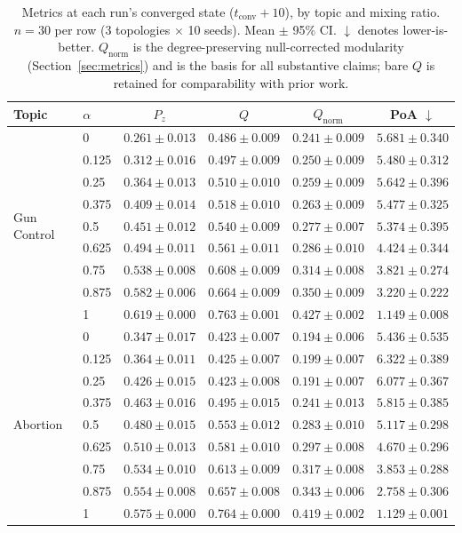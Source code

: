 \begin{table}[t]
\centering
\caption{Metrics at each run's converged state ($t_{\mathrm{conv}} + 10$), by topic and
mixing ratio. $n = 30$ per row (3 topologies $\times$ 10 seeds). Mean $\pm$ 95\% CI.
$\downarrow$ denotes lower-is-better. $Q_{\mathrm{norm}}$ is the degree-preserving
null-corrected modularity (Section~\ref{sec:metrics}) and is the basis for all
substantive claims; bare $Q$ is retained for comparability with prior work.}
\label{tab:main}
\begin{tabular}{llcccc}
\toprule
Topic & $\alpha$ & $P_z$ & $Q$ & $Q_{\mathrm{norm}}$ & PoA $\downarrow$ \\
\midrule
\multirow{9}{*}{Gun Control}
 & 0     & $0.261 \pm 0.013$ & $0.486 \pm 0.009$ & $0.241 \pm 0.009$ & $5.681 \pm 0.340$ \\
 & 0.125 & $0.312 \pm 0.016$ & $0.497 \pm 0.009$ & $0.250 \pm 0.009$ & $5.480 \pm 0.312$ \\
 & 0.25  & $0.364 \pm 0.013$ & $0.510 \pm 0.010$ & $0.259 \pm 0.009$ & $5.642 \pm 0.396$ \\
 & 0.375 & $0.409 \pm 0.014$ & $0.518 \pm 0.010$ & $0.263 \pm 0.009$ & $5.477 \pm 0.325$ \\
 & 0.5   & $0.451 \pm 0.012$ & $0.540 \pm 0.009$ & $0.277 \pm 0.007$ & $5.374 \pm 0.395$ \\
 & 0.625 & $0.494 \pm 0.011$ & $0.561 \pm 0.011$ & $0.286 \pm 0.010$ & $4.424 \pm 0.344$ \\
 & 0.75  & $0.538 \pm 0.008$ & $0.608 \pm 0.009$ & $0.314 \pm 0.008$ & $3.821 \pm 0.274$ \\
 & 0.875 & $0.582 \pm 0.006$ & $0.664 \pm 0.009$ & $0.350 \pm 0.009$ & $3.220 \pm 0.222$ \\
 & 1     & $0.619 \pm 0.000$ & $0.763 \pm 0.001$ & $0.427 \pm 0.002$ & $\mathbf{1.149 \pm 0.008}$ \\
\midrule
\multirow{9}{*}{Abortion}
 & 0     & $0.347 \pm 0.017$ & $0.423 \pm 0.007$ & $0.194 \pm 0.006$ & $5.436 \pm 0.535$ \\
 & 0.125 & $0.364 \pm 0.011$ & $0.425 \pm 0.007$ & $0.199 \pm 0.007$ & $6.322 \pm 0.389$ \\
 & 0.25  & $0.426 \pm 0.015$ & $0.423 \pm 0.008$ & $0.191 \pm 0.007$ & $6.077 \pm 0.367$ \\
 & 0.375 & $0.463 \pm 0.016$ & $0.495 \pm 0.015$ & $0.241 \pm 0.013$ & $5.815 \pm 0.385$ \\
 & 0.5   & $0.480 \pm 0.015$ & $0.553 \pm 0.012$ & $0.283 \pm 0.010$ & $5.117 \pm 0.298$ \\
 & 0.625 & $0.510 \pm 0.013$ & $0.581 \pm 0.010$ & $0.297 \pm 0.008$ & $4.670 \pm 0.296$ \\
 & 0.75  & $0.534 \pm 0.010$ & $0.613 \pm 0.009$ & $0.317 \pm 0.008$ & $3.853 \pm 0.288$ \\
 & 0.875 & $0.554 \pm 0.008$ & $0.657 \pm 0.008$ & $0.343 \pm 0.006$ & $2.758 \pm 0.306$ \\
 & 1     & $0.575 \pm 0.000$ & $0.764 \pm 0.000$ & $0.419 \pm 0.002$ & $\mathbf{1.129 \pm 0.001}$ \\
\bottomrule
\end{tabular}
\end{table}

